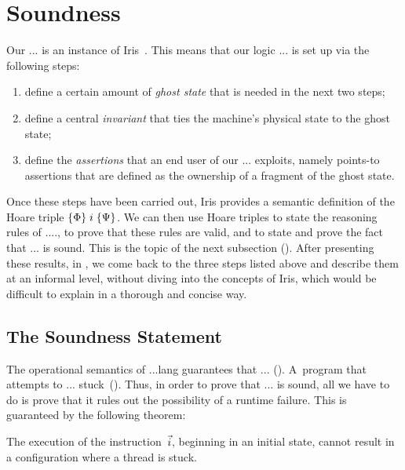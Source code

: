 \section{Soundness}
\label{sec:soundness}

Our ... is an instance of Iris~\cite{iris}. This means that our logic ... is set up
via the following steps:

\begin{enumerate}
\item define a certain amount of \emph{ghost state}
      that is needed in the next two steps;
\item define a central \emph{invariant}
      that ties the machine's physical state
      to the ghost state;
\item
  define the \emph{assertions} that an end user of our ... exploits, namely
  points-to assertions that are defined as the ownership
  of a fragment of the ghost state.
\end{enumerate}

Once these steps have been carried out, Iris provides a semantic definition of
the Hoare triple $\{\Phi\}\;i\;\{\Psi\}$. We can then use Hoare triples to
state the reasoning rules of ...., to prove that
these rules are valid, and to state and prove the fact that ... is sound.
This is the topic of the next subsection ().
%
After presenting these results, in , we come back to the
three steps listed above and describe them at an informal level, without
diving into the concepts of Iris, which would be difficult to explain in a
thorough and concise way.

\subsection{The Soundness Statement}
\label{def:soundness:statement}

The operational semantics of ...lang guarantees that ... (). A~program that attempts to ... stuck~().
Thus, in order to prove that ... is sound, all we have to do is prove that
it rules out the possibility of a runtime failure. This is guaranteed by the
following theorem:

\begin{theorem}
\label{th:adequacy}
 The execution of the instruction~$\vec{i}$, beginning in an initial state, cannot result in a configuration where a thread is stuck.
\end{theorem}

